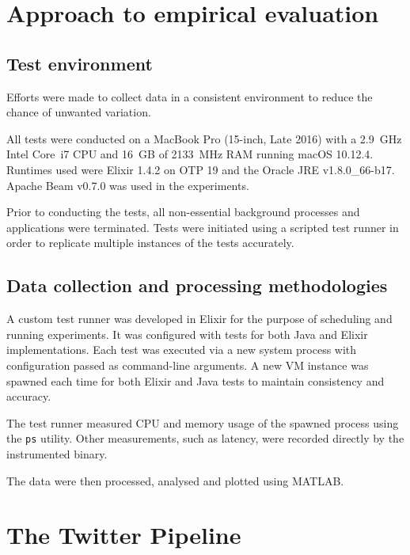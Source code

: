 \section{Approach to empirical evaluation}\label{sec:eval:approach}

\subsection{Test environment}\label{sec:eval:approach:environment}

Efforts were made to collect data in a consistent environment to reduce the chance of unwanted variation.

All tests were conducted on a MacBook Pro (15-inch, Late 2016) with a \SI{2.9}{\giga\hertz} Intel Core~i7 CPU and \SI{16}{GB} of \SI{2133}{\mega\hertz} RAM running macOS 10.12.4.
Runtimes used were Elixir 1.4.2 on OTP 19 and the Oracle JRE v1.8.0\_66-b17.
Apache Beam v0.7.0 was used in the experiments.

Prior to conducting the tests, all non-essential background processes and applications were terminated.
Tests were initiated using a scripted test runner in order to replicate multiple instances of the tests accurately.

\subsection{Data collection and processing methodologies}\label{sec:eval:approach:collection}

A custom test runner was developed in Elixir for the purpose of scheduling and running experiments.
It was configured with tests for both Java and Elixir implementations.
Each test was executed via a new system process with configuration passed as command-line arguments.
A new VM instance was spawned each time for both Elixir and Java tests to maintain consistency and accuracy.

The test runner measured CPU and memory usage of the spawned process using the \verb|ps| utility.
Other measurements, such as latency, were recorded directly by the instrumented binary.

The data were then processed, analysed and plotted using MATLAB.

\section{The Twitter Pipeline}\label{sec:eval:approach:twitter}

